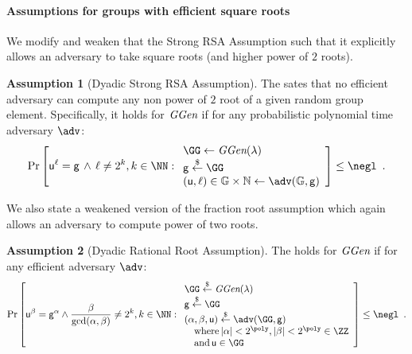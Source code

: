\documentclass{article}
\theoremstyle{definition}
\newtheorem{assumption}{Assumption}
\begin{document}
\paragraph{Assumptions for groups with efficient square roots}
We modify and weaken that the Strong RSA Assumption such that it explicitly allows an adversary to take square roots (and higher power of $2$ roots).
\begin{assumption}[Dyadic Strong RSA Assumption]
\label{assum:dyadicstrongRSA}
The  sates that no efficient adversary can compute any non power of $2$ root of a given random group element. Specifically, it holds for $\textit{GGen}$ if for any probabilistic polynomial time adversary $\adv$:
\[
    \Pr\left[\gr{u}^\ell = \gr{g} \, \wedge \, \ell\neq 2^k, k \in \NN:
    \begin{array}{l}
         \GG \leftarrow \ggen(\lambda)  \\
         \gr{g} \sample \GG \\
         (\gr{u}, \ell) \in \mathbb{G} \times \mathbb{N} \leftarrow \adv(\mathbb{G}, \gr{g}) \\
    \end{array}\right] \leq \negl \enspace .
\]
\end{assumption} 

We also state a weakened version of the fraction root assumption which again allows an adversary to compute power of two roots.
\begin{assumption}[Dyadic Rational Root Assumption]
\label{assum:dyadicfracroot}
The  holds for $\textit{GGen}$ if for any efficient adversary $\adv$:
\[        
                \Pr\left[\gr{u}^\beta = \gr{g}^{\alpha} \wedge \frac{\beta}{\gcd(\alpha,\beta)}\neq 2^k,  k \in \NN   : 
                \begin{array}{l} 
                      \GG \sample \ggen(\lambda) \\ 
                      \gr{g} \sample \GG \\
                      (\alpha, \beta, \gr{u}) \sample \adv(\GG, \gr{g}) \\
                      \quad \textnormal{where} \, |\alpha|<2^{\poly}, |\beta|<2^{\poly} \in \ZZ \\
                      \quad \textnormal{and} \, \gr{u} \in \GG 
                \end{array} 
        \right] \leq \negl \enspace .
\]
\end{assumption}
\end{document}
